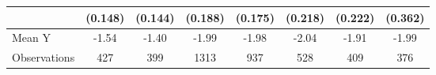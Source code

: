 {\begin{tabular}{l*{7}{c}}
            &     (0.148)         &     (0.144)         &     (0.188)         &     (0.175)         &     (0.218)         &     (0.222)         &     (0.362)         \\
\midrule
Mean Y      &       -1.54         &       -1.40         &       -1.99         &       -1.98         &       -2.04         &       -1.91         &       -1.99         \\
Observations&         427         &         399         &        1313         &         937         &         528         &         409         &         376         \\
\bottomrule
\end{tabular}
}
